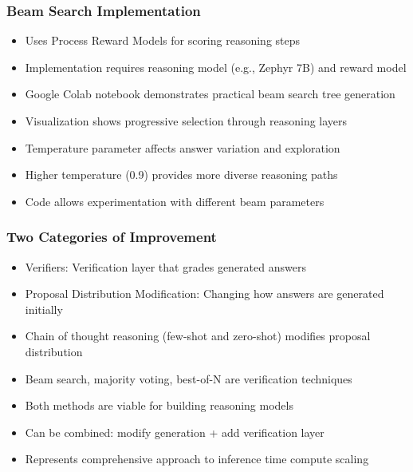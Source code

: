 \begin{frame}[fragile]\frametitle{Beam Search Implementation}
      \begin{itemize}
        \item Uses Process Reward Models for scoring reasoning steps
        \item Implementation requires reasoning model (e.g., Zephyr 7B) and reward model
        \item Google Colab notebook demonstrates practical beam search tree generation
        \item Visualization shows progressive selection through reasoning layers
        \item Temperature parameter affects answer variation and exploration
        \item Higher temperature (0.9) provides more diverse reasoning paths
        \item Code allows experimentation with different beam parameters
      \end{itemize}
\end{frame}

\begin{frame}[fragile]\frametitle{Two Categories of Improvement}
      \begin{itemize}
        \item Verifiers: Verification layer that grades generated answers
        \item Proposal Distribution Modification: Changing how answers are generated initially
        \item Chain of thought reasoning (few-shot and zero-shot) modifies proposal distribution
        \item Beam search, majority voting, best-of-N are verification techniques
        \item Both methods are viable for building reasoning models
        \item Can be combined: modify generation + add verification layer
        \item Represents comprehensive approach to inference time compute scaling
      \end{itemize}
\end{frame}
